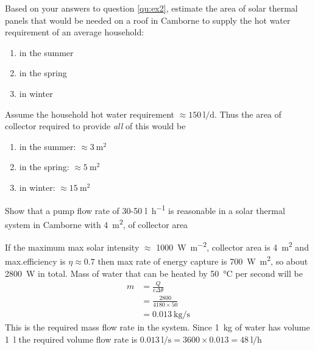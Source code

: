 \documentclass{article} %
\begin{document}
\begin{question}\label{qu:ex3}
Based on your answers to question \ref{qu:ex2}, estimate the area of solar thermal panels that would be needed on a roof in Camborne to supply the hot water requirement of an average household:
    \begin{enumerate}[label=\alph*)]
        \item in the summer
        \item in the spring
        \item in winter
    \end{enumerate}
\end{question}
\begin{solution}
Assume the household hot water requirement $\approx \SI{150}{\litre\per\day}$. Thus the area of collector required to provide \emph{all} of this would be
    \begin{enumerate}[label=\alph*)]
        \item in the summer: $\approx \SI{3}{\metre\squared}$
        \item in the spring: $\approx \SI{5}{\metre\squared}$
        \item in winter: $\approx \SI{15}{\metre\squared}$
    \end{enumerate}
\end{solution}

\begin{question}
Show that a pump flow rate of 30-50 \si{\litre\per\hour} is reasonable in a solar thermal system in Camborne with \SI{4}{\metre\squared}, of collector area
\end{question}
\begin{solution}
If the maximum max solar intensity $\approx$ \SI{1000}{\watt\per\metre\squared}, collector area is \SI{4}{\metre\squared} and max.efficiency is $\eta \approx 0.7$ then max rate of energy capture is \SI{700}{\watt\metre\squared}, so about  \SI{2800}{\watt} in total. Mass of water that can be heated by \SI{50}{\celsius} per second will be
\begin{align*}
m&=\frac{Q}{c\Delta\theta}\\
&=\frac{2800}{4180\times 50}\\
&=\SI{0.013}{\kg\per\second}
\end{align*}
This is the required mass flow rate in the system. Since \SI{1}{\kg} of water has volume \SI{1}{\litre} the required volume flow rate is $\SI{0.013}{\litre\per\second}=3600\times 0.013= \SI{48}{\litre\per\hour}$
\end{solution}
\end{document}
